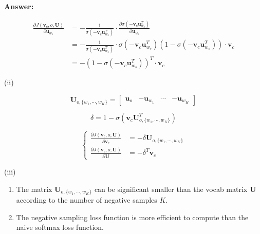 \documentclass{article}
\newenvironment{answer}{
    {\bf Answer:} \sf \begingroup\color{red}
}{\endgroup}%
\begin{document}
\begin{enumerate}[label=(\alph*)]
\begin{shaded}
\begin{answer}
    \begin{equation}
        \begin{align}
            \frac{\partial{J(\bm v_c,o,\bm U)}}{\partial{\bm u_{w_s}}} &= - \frac{1}{ \sigma(-\bm v_c\bm u_{w_s}^T)}\cdot\frac{\partial{ \sigma(-\bm v_c\bm u_{w_s}^T)}}{\partial{\bm u_{w_s}}} \\
            &= - \frac{1}{ \sigma(-\bm v_c\bm u_{w_s}^T)}\cdot \sigma(-\bm v_c\bm u_{w_s}^T) \left(1-\sigma(-\bm v_c\bm u_{w_s}^T)\right) \cdot \bm v_c \\
            &= - \left(1-\sigma(-\bm v_c\bm u_{w_s}^T)\right)^T \cdot \bm v_c
        \end{align}\label{eq:1g3}
    \end{equation}

    (ii)

    \begin{equation}
        \bm U_{o,\{w_1,\cdots,w_K\}}=
        \begin{bmatrix}
            \bm u_o & -\bm u_{w_1} & \cdots & -\bm u_{w_K}
        \end{bmatrix}\label{eq:1g4}
    \end{equation}

    \begin{equation}
        \delta = 1-\sigma(\bm v_c\bm U_{o,\{w_1,\cdots,w_K\}}^T)\label{eq:1g5}
    \end{equation}

    \begin{equation}
        \begin{cases}
            \frac{\partial{J(\bm v_c,o,\bm U)}}{\partial{\bm v_c}} & = -\delta \bm U_{o,\{w_1,\cdots,w_K\}}\\
            \frac{\partial{J(\bm v_c,o,\bm U)}}{\partial{\bm U}} & = -\delta^T \bm v_c
        \end{cases}\label{eq:1g6}
    \end{equation}

    (iii)

    \begin{enumerate}
        \item The matrix $\bm U_{o,\{w_1,\cdots,w_K\}}$ can be significant smaller than the vocab matrix $\bm U$ according to the number of negative samples $K$.
        \item The negative sampling loss function is more efficient to compute than the naive softmax loss function.
    \end{enumerate}


\end{answer}
\end{shaded}
\end{enumerate}
\end{document}
